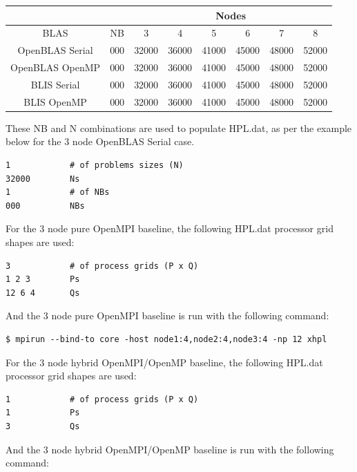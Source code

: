 \documentclass{report}
\begin{document}
\begin{center}
	\begin{tabular}{ |c|c|c|c|c|c|c|c| } 
		\hline
		\multicolumn{2}{|c|}{} & \multicolumn{6}{c|}{Nodes} \\
		\hline
		BLAS & NB & 3 & 4 & 5 & 6 & 7 & 8 \\ 
		\hline
		OpenBLAS Serial & 000 & 32000 & 36000 & 41000 & 45000 & 48000 & 52000 \\ 
		OpenBLAS OpenMP & 000 & 32000 & 36000 & 41000 & 45000 & 48000 & 52000 \\ 
 		BLIS Serial     & 000 & 32000 & 36000 & 41000 & 45000 & 48000 & 52000 \\
		BLIS OpenMP     & 000 & 32000 & 36000 & 41000 & 45000 & 48000 & 52000 \\ 
 		\hline
	\end{tabular}
\end{center}

These NB and N combinations are used to populate HPL.dat, as per the example below for the 3 node OpenBLAS Serial case.

\lstset{style=listing}
\begin{lstlisting}[numbers=none]
1            # of problems sizes (N)
32000        Ns
1            # of NBs
000          NBs
\end{lstlisting}

For the 3 node pure OpenMPI baseline, the following HPL.dat processor grid shapes are used: 

\lstset{style=listing}
\begin{lstlisting}[numbers=none]
3            # of process grids (P x Q)
1 2 3        Ps
12 6 4       Qs
\end{lstlisting}

And the 3 node pure OpenMPI baseline is run with the following command:

\lstset{style=type}
\begin{lstlisting}[]
$ mpirun --bind-to core -host node1:4,node2:4,node3:4 -np 12 xhpl
\end{lstlisting}

For the 3 node hybrid OpenMPI/OpenMP baseline, the following HPL.dat processor grid shapes are used: 

\lstset{style=listing}
\begin{lstlisting}[numbers=none]
1            # of process grids (P x Q)
1            Ps
3            Qs
\end{lstlisting}

And the 3 node hybrid OpenMPI/OpenMP baseline is run with the following command:
\end{document}
